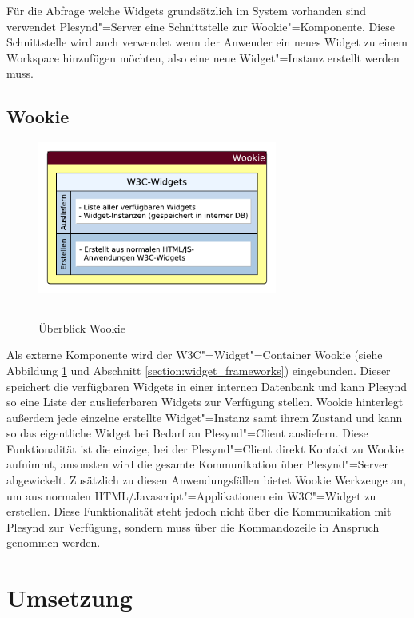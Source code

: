 Für die Abfrage welche Widgets grundsätzlich im System vorhanden sind verwendet Plesynd"=Server eine Schnittstelle zur Wookie"=Komponente. Diese Schnittstelle wird auch verwendet wenn der Anwender ein neues Widget zu einem Workspace hinzufügen möchten, also eine neue Widget"=Instanz erstellt werden muss.

\subsection{Wookie}\label{section:loesung_wookie}
\begin{figure}[ht]
  \centering
  \includegraphics[height=5cm,keepaspectratio]{./Figures/konzeptionelle_loesung_wookie.pdf}
    \rule{35em}{0.5pt}
  \caption[Überblick Wookie]{Überblick Wookie}
  \label{fig:ueberblick_wookie}
\end{figure}
Als externe Komponente wird der W3C"=Widget"=Container Wookie (siehe Abbildung \ref{fig:ueberblick_wookie} und Abschnitt \ref{section:widget_frameworks}) eingebunden. Dieser speichert die verfügbaren Widgets in einer internen Datenbank und kann Plesynd so eine Liste der auslieferbaren Widgets zur Verfügung stellen. Wookie hinterlegt außerdem jede einzelne erstellte Widget"=Instanz samt ihrem Zustand und kann so das eigentliche Widget bei Bedarf an Plesynd"=Client ausliefern. Diese Funktionalität ist die einzige, bei der Plesynd"=Client direkt Kontakt zu Wookie aufnimmt, ansonsten wird die gesamte Kommunikation über Plesynd"=Server abgewickelt. Zusätzlich zu diesen Anwendungsfällen bietet Wookie Werkzeuge an, um aus normalen HTML/Javascript"=Applikationen ein W3C"=Widget zu erstellen. Diese Funktionalität steht jedoch nicht über die Kommunikation mit Plesynd zur Verfügung, sondern muss über die Kommandozeile in Anspruch genommen werden.

\section{Umsetzung}\label{section:umsetzung}

